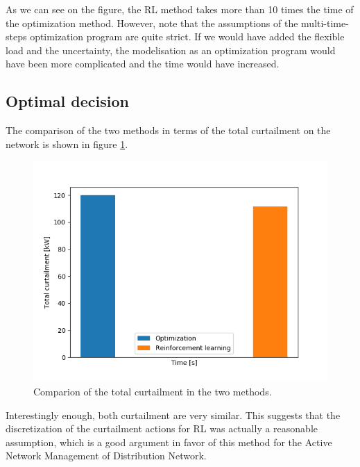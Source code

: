 As we can see on the figure, the RL method takes more than 10 times the time of the optimization method.
However, note that the assumptions of the multi-time-steps optimization program are quite strict.
If we would have added the flexible load and the uncertainty, the modelisation as an optimization program would have been more complicated and the time would have increased.

\subsection{Optimal decision}
The comparison of the two methods in terms of the total curtailment on the network is shown in figure \ref{fig:curt_comp}.

\begin{figure}
\centering
\includegraphics[scale=0.5]{img/curt_comp}
\caption{Comparion of the total curtailment in the two methods.}
\label{fig:curt_comp}
\end{figure}

Interestingly enough, both curtailment are very similar.
This suggests that the discretization of the curtailment actions for RL was actually a reasonable assumption, which is a good argument in favor of this method for the Active Network Management of Distribution Network.


